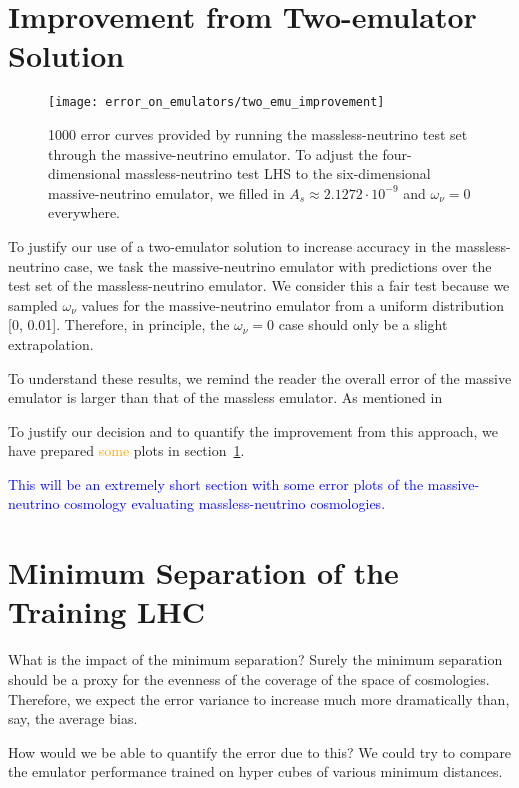 \section{Improvement from Two-emulator Solution}
\label{sec: 2emu_improvement}

\begin{figure}[ht!]
  \centering
  \texttt{[image: error\_on\_emulators/two\_emu\_improvement]}
  \caption[Default Massive Emulator Performance]{1000 error curves provided
  	by running the massless-neutrino test set through the massive-neutrino 
  	emulator. To adjust the four-dimensional massless-neutrino test LHS to
  	the six-dimensional massive-neutrino emulator, we filled in
  	$A_s \approx 2.1272 \cdot 10^{-9}$ and $\omega_\nu = 0$ everywhere.}
  \label{fig: two_emu_errs}
\end{figure}

To justify our use of a two-emulator solution to increase
accuracy in the massless-neutrino case, we task the massive-neutrino emulator with
predictions over the test set of the massless-neutrino emulator. We consider
this a fair test because we sampled $\omega_\nu$ values for the
massive-neutrino emulator from a uniform distribution [0, 0.01]. Therefore,
in principle, the $\omega_\nu = 0$ case should only be a slight extrapolation.

To understand these results, we remind the reader the overall error of the
massive emulator is larger than that of the massless emulator. As mentioned
in 

To justify our decision and to quantify the improvement from this approach, we
have prepared \textcolor{orange}{some} plots in
section~\ref{sec: 2emu_improvement}.

\textcolor{blue}{This will be an extremely short section with some error
plots of the massive-neutrino cosmology evaluating massless-neutrino
cosmologies.}

\section{Minimum Separation of the Training LHC}
\label{sec: error_from_lhc}

What is the impact of the minimum separation? Surely the minimum separation
should be a proxy for the evenness of the coverage of the space of
cosmologies. Therefore, we expect the error variance to increase much more
dramatically than, say, the average bias.

How would we be able to quantify the error due to this? We could try to 
compare the emulator performance trained on hyper cubes of various minimum 
distances.

